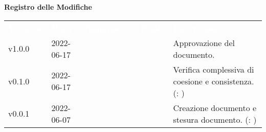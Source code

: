 

{\LARGE{\textbf{Registro delle Modifiche}}} \\
\begin{table}[!htbp]
\renewcommand{\arraystretch}{1.5}
\begin{tabular}{ m{}<{\centering}  m{}<{\centering}  m{}<{\centering}  m{}<{\centering}  m{}<{\centering} }
	\rowcolor{darkblue}
	\textcolor{white}{\textbf{Versione}} &\textcolor{white}{\textbf{Data}}& \textcolor{white}{\textbf{Nominativo}} & \textcolor{white}{\textbf{Ruolo}}&\textcolor{white}{\textbf{Descrizione}}\\ 

	v1.0.0 & 2022-06-17 & \MB & \RE & Approvazione del documento. \\

	v0.1.0& 2022-06-17 & \GC & \AN & Verifica complessiva di coesione e consistenza. (\VE: \textit{\GC})\\

	v0.0.1& 2022-06-07 & \PV & \AN & Creazione documento e stesura documento. (\VE: \textit{\GC})\\
	
	
\end{tabular}
\end{table}

\pagebreak